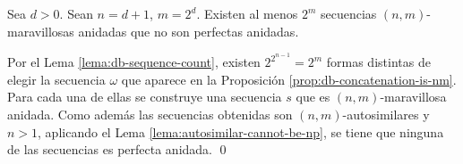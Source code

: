 \begin{teo}
  Sea $d > 0$. Sean $n = d + 1$, $m = 2^d$. Existen al menos $2^m$
  secuencias $(n, m)$-maravillosas anidadas que no son perfectas anidadas.
\end{teo}

\begin{demo}
  Por el Lema \ref{lema:db-sequence-count}, existen $2^{2^{n-1}} = 2^m$ formas
  distintas de elegir la secuencia $\omega$ que aparece en la Proposición
  \ref{prop:db-concatenation-is-nm}. Para cada una de ellas se construye una
  secuencia $s$ que es $(n, m)$-maravillosa anidada. Como además las
  secuencias obtenidas son $(n,m)$-autosimilares y $n > 1$, aplicando el Lema
  \ref{lema:autosimilar-cannot-be-np}, se tiene que ninguna de las secuencias
  es perfecta anidada. \qed
\end{demo}

